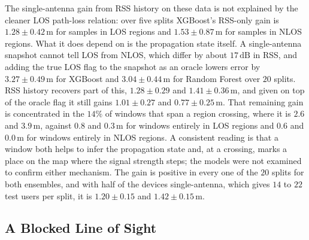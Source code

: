 The single-antenna gain from RSS history on these data is not explained by the cleaner LOS path-loss relation: over five splits XGBoost's RSS-only gain is $1.28 \pm 0.42\,\text{m}$ for samples in LOS regions and $1.53 \pm 0.87\,\text{m}$ for samples in NLOS regions. What it does depend on is the propagation state itself. A single-antenna snapshot cannot tell LOS from NLOS, which differ by about $17\,\text{dB}$ in RSS, and adding the true LOS flag to the snapshot as an oracle lowers error by $3.27 \pm 0.49\,\text{m}$ for XGBoost and $3.04 \pm 0.44\,\text{m}$ for Random Forest over $20$ splits. RSS history recovers part of this, $1.28 \pm 0.29$ and $1.41 \pm 0.36\,\text{m}$, and given on top of the oracle flag it still gains $1.01 \pm 0.27$ and $0.77 \pm 0.25\,\text{m}$. That remaining gain is concentrated in the $14\%$ of windows that span a region crossing, where it is $2.6$ and $3.9\,\text{m}$, against $0.8$ and $0.3\,\text{m}$ for windows entirely in LOS regions and $0.6$ and $0.0\,\text{m}$ for windows entirely in NLOS regions. A consistent reading is that a window both helps to infer the propagation state and, at a crossing, marks a place on the map where the signal strength steps; the models were not examined to confirm either mechanism. The gain is positive in every one of the $20$ splits for both ensembles, and with half of the devices single-antenna, which gives $14$ to $22$ test users per split, it is $1.20 \pm 0.15$ and $1.42 \pm 0.15\,\text{m}$.

\subsection{A Blocked Line of Sight}
\label{subsec:blocked}

